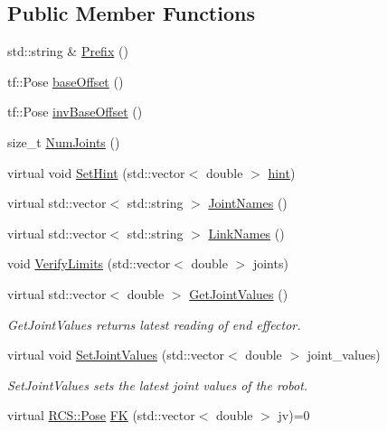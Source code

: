 \subsection*{Public Member Functions}
\begin{DoxyCompactItemize}
\item 
std\-::string \& \hyperlink{classIKinematics_a1b3ec37d8072bacf767bafded072cab6}{Prefix} ()
\item 
tf\-::\-Pose \hyperlink{classIKinematics_aad69b3810156bd45c4be526ddc067358}{base\-Offset} ()
\item 
tf\-::\-Pose \hyperlink{classIKinematics_a22b46b2751763d5d2242c02de6bbd8f2}{inv\-Base\-Offset} ()
\item 
size\-\_\-t \hyperlink{classIKinematics_a95ceb0b9c129601bb54851f38e72b65a}{Num\-Joints} ()
\item 
virtual void \hyperlink{classIKinematics_a9812392000d7f06ae0353789e8e15606}{Set\-Hint} (std\-::vector$<$ double $>$ \hyperlink{classIKinematics_a7e8f1a113eafba9c64ab73a8cb279924}{hint})
\item 
virtual std\-::vector$<$ std\-::string $>$ \hyperlink{classIKinematics_a9b46e78ddaefe53f8f11221ac61b2bf5}{Joint\-Names} ()
\item 
virtual std\-::vector$<$ std\-::string $>$ \hyperlink{classIKinematics_a20a4753ef6dcd172b1a8d46a5789721c}{Link\-Names} ()
\item 
void \hyperlink{classIKinematics_ae438694ab63ef84b5f82b620d1a9ac96}{Verify\-Limits} (std\-::vector$<$ double $>$ joints)
\item 
virtual std\-::vector$<$ double $>$ \hyperlink{classIKinematics_a500626041c92cf99c7908a456f87fe0d}{Get\-Joint\-Values} ()
\begin{DoxyCompactList}\small\item\em Get\-Joint\-Values returns latest reading of end effector. \end{DoxyCompactList}\item 
virtual void \hyperlink{classIKinematics_a1292421c1061dc321016c7039692e189}{Set\-Joint\-Values} (std\-::vector$<$ double $>$ joint\-\_\-values)
\begin{DoxyCompactList}\small\item\em Set\-Joint\-Values sets the latest joint values of the robot. \end{DoxyCompactList}\item 
virtual \hyperlink{namespaceRCS_aa07e45d8a50e30064283d2b38087f999}{R\-C\-S\-::\-Pose} \hyperlink{classIKinematics_abf765053ac39fac5b94ef99e80b17f1b}{F\-K} (std\-::vector$<$ double $>$ jv)=0

\end{DoxyCompactItemize}
